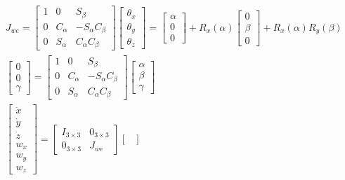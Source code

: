 \documentclass[12pt]{article}
\begin{document}
\begin{CJK}{UTF8}{bsmi}
\begin{equation*}
\begin{split}
&J_{we} =				
\begin{bmatrix}
1 & 0 & S_\beta \\ 
0 & C_\alpha & -S_\alpha C_\beta \\ 
0 & S_\alpha & C_\alpha C_\beta
\end{bmatrix}
\begin{bmatrix}
\theta _x \\ 
\theta _y \\ 
\theta _z
\end{bmatrix}
=
\begin{bmatrix}
\alpha \\ 
0\\ 
0
\end{bmatrix}
+
R_x(\alpha)
\begin{bmatrix}
0 \\ 
\beta \\ 
0
\end{bmatrix}
+
R_x(\alpha)R_y(\beta) \\
&\begin{bmatrix}
0 \\ 
0\\ 
\gamma
\end{bmatrix}
=
\begin{bmatrix}
1 & 0 & S_\beta \\ 
0 & C_\alpha & -S_\alpha C_\beta \\ 
0 & S_\alpha & C_\alpha C_\beta
\end{bmatrix}
\begin{bmatrix}
\alpha \\ 
\beta\\ 
\gamma
\end{bmatrix}\\
&\begin{bmatrix}				
\dot{x} \\
\dot{y} \\
\dot{z} \\
w_x \\ 
w_y \\ 
w_z
\end{bmatrix}
=
\begin{bmatrix}
I_{3\times 3} & 0_{3\times 3}\\
0_{3\times 3} & J_{we}
\end{bmatrix}
\begin{bmatrix}

\end{bmatrix}
\end{split}
\end{equation*}
\end{CJK}
\end{document}

